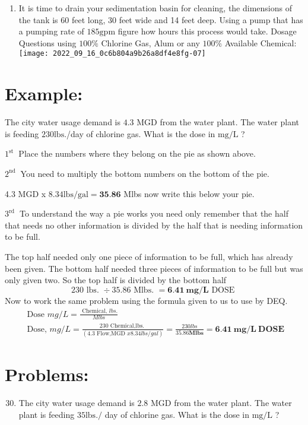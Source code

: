 \begin{enumerate}
\begin{enumerate}
  \item It is time to drain your sedimentation basin for cleaning, the dimensions of the tank is 60 feet long, 30 feet wide and 14 feet deep. Using a pump that has a pumping rate of $185 \mathrm{gpm}$ figure how hours this process would take. Dosage Questions using $100 \%$ Chlorine Gas, Alum or any $100 \%$ Available Chemical:\\

\texttt{[image: 2022\_09\_16\_0c6b804a9b26a8df4e8fg-07]}

\end{enumerate}
\section{Example:}
The city water usage demand is $4.3$ MGD from the water plant. The water plant is feeding $230 \mathrm{lbs}$./day of chlorine gas. What is the dose in $\mathrm{mg} / \mathrm{L}$ ?

$1^{\text {st }}$ Place the numbers where they belong on the pie as shown above.

$2^{\text {nd }}$ You need to multiply the bottom numbers on the bottom of the pie.

4.3 MGD x $8.34 \mathrm{lbs} / \mathrm{gal}=\mathbf{3 5 . 8 6}$ Mlbs now write this below your pie.

$3^{\text {rd }}$ To understand the way a pie works you need only remember that the half that needs no other information is divided by the half that is needing information to be full.

The top half needed only one piece of information to be full, which has already been given. The bottom half needed three pieces of information to be full but was only given two. So the top half is divided by the bottom half
$$
230 \text { lbs. } \div 35.86 \text { Mlbs. }=\mathbf{6 . 4 1} \mathbf{~ m g} / \mathbf{L} \text { DOSE }
$$
Now to work the same problem using the formula given to us to use by DEQ.
$$
\begin{gathered}
\text { Dose } m g / L=\frac{\text { Chemical, } l b s .}{M l b s} \\
\text { Dose, } m g / L=\frac{230 \text { Chemical,lbs. }}{(4.3 \text { Flow,MGD } x 8.34 l b s / g a l)}=\frac{230 l b s}{35.86 \mathbf{M l b s}}=\mathbf{6 . 4 1} \mathbf{~ m g} / \mathbf{L ~ D O S E}
\end{gathered}
$$

\section{Problems:}
\begin{enumerate}
  \setcounter{enumi}{29}
  \item The city water usage demand is $2.8$ MGD from the water plant. The water plant is feeding $35 \mathrm{lbs} . /$ day of chlorine gas. What is the dose in $\mathrm{mg} / \mathrm{L}$ ?


\end{enumerate}
\end{enumerate}

